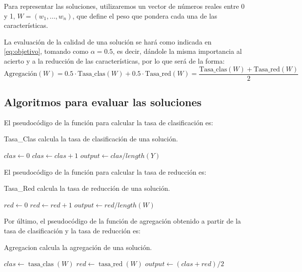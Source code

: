 \documentclass[11pt,a4paper]{article}
\begin{document}
Para representar las soluciones, utilizaremos un vector de números reales entre 0 y 1, $W = (w_{1}, \dots, w_{n})$, que define el peso que pondera cada una de las características.

La evaluación de la calidad de una solución se hará como indicada en \eqref{eq:objetivo}, tomando como $\alpha = 0.5$, es decir, dándole la misma importancia al acierto y a la reducción de las características, por lo que será de la forma:
$$\text{Agregación}(W) = 0.5 \cdot \text{Tasa\_clas}(W) + 0.5 \cdot \text{Tasa\_red}(W) = \frac{\text{Tasa\_clas}(W) + \text{Tasa\_red}(W)}{2}$$

\subsection{Algoritmos para evaluar las soluciones}

El pseudocódigo de la función para calcular la tasa de clasificación es: \\
\begin{algorithm}[H]
	\caption{{\sc Tasa\_Clas} calcula la tasa de clasificación de una solución.}
	
	$clas \gets 0$ \;
	 {
		 {
			$clas \gets clas + 1$ \;
		}
	}
	$output \gets clas / length(Y)$ \;
	 \;
\end{algorithm}

El pseudocódigo de la función para calcular la tasa de reducción es: \\
\begin{algorithm}[H]
	\caption{{\sc Tasa\_Red} calcula la tasa de reducción de una solución.}
	
	$red \gets 0$ \;
	 {
		 {
			$red \gets red + 1$ \;
		}
	}
	$output \gets red / length(W)$ \;
	 \;
\end{algorithm}

Por último, el pseudocódigo de la función de agregación obtenido a partir de la tasa de clasificación y la tasa de reducción es: \\
\begin{algorithm}[H] \label{alg:agregation}
	\caption{{\sc Agregacion} calcula la agregación de una solución.}
	
	$clas \gets \operatorname{tasa\_clas}(W)$ \;
	$red \gets \operatorname{tasa\_red}(W)$ \;
	$output \gets (clas + red)/2$ \;
	 \;
\end{algorithm}
\end{document}

